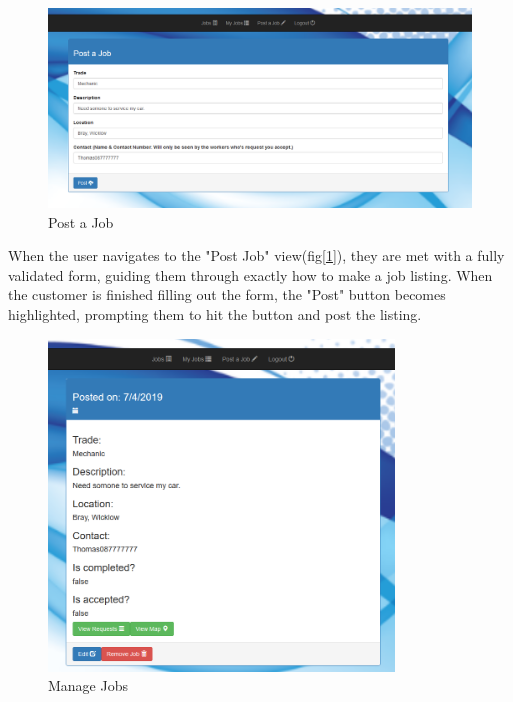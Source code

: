 \begin{figure}[H]
    \centering
    \includegraphics[width=\textwidth, height=150pt]{img/Customer2.PNG}
    \caption{Post a Job}
    \label{fig:postView}
\end{figure}

\bigskip

When the user navigates to the "Post Job" view(fig[\ref{fig:postView}]), they are met with a fully validated form, guiding them through exactly how to make a job listing. When the customer is finished filling out the form, the "Post" button becomes highlighted, prompting them to hit the button and post the listing.

\begin{figure}[H]
    \centering
    \includegraphics[width=\textwidth, height=250pt]{img/Customer3.PNG}
    \caption{Manage Jobs}
    \label{fig:manageJobs}
\end{figure}

\bigskip


